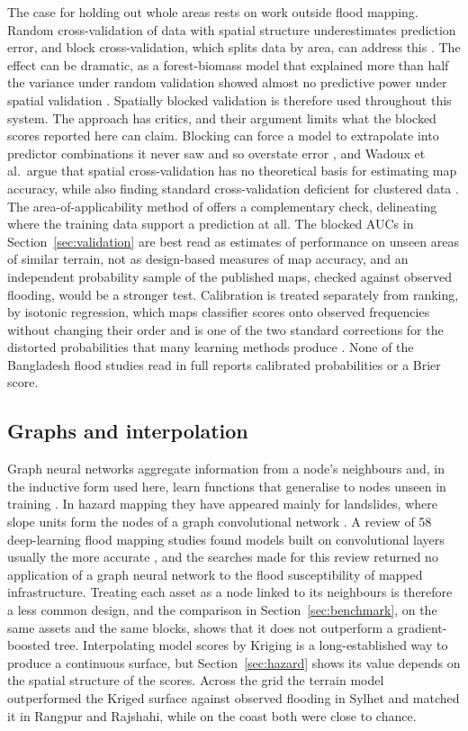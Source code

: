 \documentclass[10pt,a4paper,twocolumn]{article}
\begin{document}
The case for holding out whole areas rests on work outside flood mapping. Random cross-validation of data with spatial structure underestimates prediction error, and block cross-validation, which splits data by area, can address this \citep{roberts2017}. The effect can be dramatic, as a forest-biomass model that explained more than half the variance under random validation showed almost no predictive power under spatial validation \citep{ploton2020}. Spatially blocked validation is therefore used throughout this system. The approach has critics, and their argument limits what the blocked scores reported here can claim. Blocking can force a model to extrapolate into predictor combinations it never saw and so overstate error \citep{roberts2017}, and Wadoux et al.\ argue that spatial cross-validation has no theoretical basis for estimating map accuracy, while also finding standard cross-validation deficient for clustered data \citep{wadoux2021}. The area-of-applicability method of \citet{meyer2021} offers a complementary check, delineating where the training data support a prediction at all. The blocked AUCs in Section~\ref{sec:validation} are best read as estimates of performance on unseen areas of similar terrain, not as design-based measures of map accuracy, and an independent probability sample of the published maps, checked against observed flooding, would be a stronger test. Calibration is treated separately from ranking, by isotonic regression, which maps classifier scores onto observed frequencies without changing their order \citep{zadrozny2002} and is one of the two standard corrections for the distorted probabilities that many learning methods produce \citep{niculescu2005}. None of the Bangladesh flood studies read in full reports calibrated probabilities or a Brier score.

\subsection{Graphs and interpolation}

Graph neural networks aggregate information from a node's neighbours and, in the inductive form used here, learn functions that generalise to nodes unseen in training \citep{hamilton2017}. In hazard mapping they have appeared mainly for landslides, where slope units form the nodes of a graph convolutional network \citep{wang2023, ma2025}. A review of 58 deep-learning flood mapping studies found models built on convolutional layers usually the more accurate \citep{bentivoglio2022}, and the searches made for this review returned no application of a graph neural network to the flood susceptibility of mapped infrastructure. Treating each asset as a node linked to its neighbours is therefore a less common design, and the comparison in Section~\ref{sec:benchmark}, on the same assets and the same blocks, shows that it does not outperform a gradient-boosted tree. Interpolating model scores by Kriging is a long-established way to produce a continuous surface, but Section~\ref{sec:hazard} shows its value depends on the spatial structure of the scores. Across the grid the terrain model outperformed the Kriged surface against observed flooding in Sylhet and matched it in Rangpur and Rajshahi, while on the coast both were close to chance.
\end{document}

